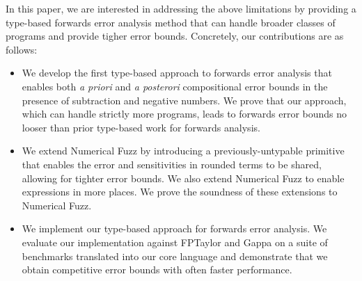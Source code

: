 In this paper, we are interested in addressing the above limitations by
providing a type-based forwards error analysis method that can handle broader
classes of programs and provide tigher error bounds. 
Concretely, our contributions are as follows:
\begin{itemize}
  \item We develop the first type-based approach to forwards error analysis that
    enables both \textit{a priori} and \textit{a posterori} compositional error
    bounds in the presence of subtraction and negative numbers. We prove that
    our approach, which can handle strictly more programs, leads to forwards
    error bounds no looser than prior type-based work for forwards analysis.

  \item We extend Numerical Fuzz by introducing a previously-untypable primitive
    that enables the error and sensitivities in rounded terms to be shared,
    allowing for tighter error bounds. We also extend Numerical Fuzz to enable
    expressions in more places. We prove the soundness of these extensions to
    Numerical Fuzz.

  \item We implement our type-based approach for forwards error analysis. We
    evaluate our implementation against FPTaylor and Gappa on a suite of
    benchmarks translated into our core language and demonstrate that we obtain
    competitive error bounds with often faster performance.
\end{itemize}



